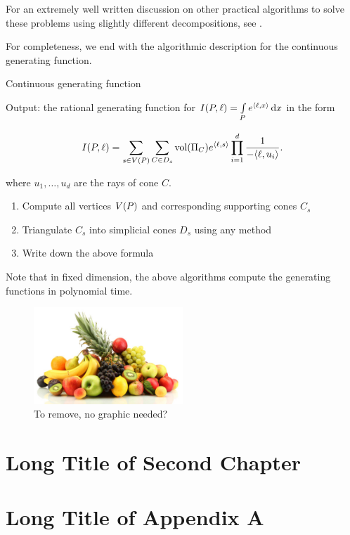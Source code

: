 For an extremely well written discussion on other practical algorithms to solve these problems using slightly different decompositions, see \cite{koeppe:irrational-barvinok}. 


For completeness, we end with the algorithmic description for the continuous generating function. 

\begin{algorithm}
\caption{Continuous generating function}

\begin{justify}
Output: the rational generating function for $I({ P}, \ell) = \int\limits_{{ P}} e^{\langle \ell, x \rangle}\,\mathrm{d} x$ in the form

\[ I({ P},\ell) = \sum_{s \in V({ P})} \sum_{C \in D_s} \text{vol} (\Pi_C)e^{{\langle} \ell, s {\rangle}} \prod_{i=1}^d \frac{1}{-{\langle} \ell, u_i {\rangle}}. \]

where $u_1, \dots, u_d$ are the rays of cone $C$.
\end{justify}
\begin{enumerate}
\item  Compute all vertices $V({ P})$ and corresponding supporting cones $C_s$
\item Triangulate $C_s$ into simplicial cones $D_s$ using any method
\item Write down the above formula
\end{enumerate}
\end{algorithm} 
 

Note that in fixed dimension, the above algorithms compute the generating functions in polynomial time. 
   
   
   \begin{figure}[h!]
  \caption{To remove, no graphic needed?}
  \centering
    \includegraphics[width=0.5\textwidth]{figures/fruit.jpg}
\end{figure}
   
   
   
   
   

   \chapter[%
      Short Title of 2nd Ch.
   ]{%
      Long Title of Second Chapter
   }%
   \label{ch:2ndChapterLabel}
   
   
   \appendix

   \chapter[%
      Short Title of Appendix A
   ]{%
      Long Title of Appendix A
   }%
   \label{ch:AppendixALabel}
   
       
   \backmatter
   
   
   
